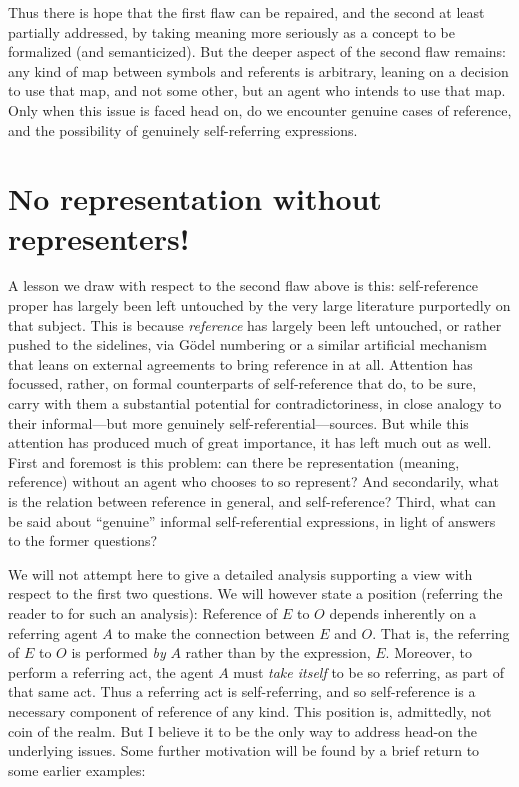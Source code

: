 \documentclass{amsart}
\begin{document}
Thus there is hope that the first flaw can be repaired, and the second
at least partially addressed, by taking meaning more seriously as a
concept to be formalized (and semanticized).  But the deeper aspect of
the second flaw remains: any kind of map between symbols and referents
is arbitrary, leaning on a decision to use that map, and not some
other, but an agent who intends to use that map.  Only when this issue
is faced head on, do we encounter genuine cases of reference, and the
possibility of genuinely self-referring expressions.


\section{No representation without representers!}

A lesson we draw with respect to the second flaw above is this:
self-reference proper has largely been 
left untouched by the very large literature purportedly on that
subject. This is because {\em reference} has largely been left
untouched, or rather pushed to the sidelines, via G\"odel numbering or
a similar artificial mechanism that leans on external agreements to
bring reference in at all. Attention has focussed, rather, on formal
counterparts of self-reference that do, to be sure, carry with them a
substantial potential for contradictoriness, in close analogy to their
informal---but more genuinely self-referential---sources.  But while
this attention has produced much of great importance, it has left much
out as well.  First and foremost is this problem: can there be
representation (meaning, reference) without an agent who chooses to so
represent?  And secondarily, what is the relation between reference in
general, and self-reference?  Third, what can be said about
``genuine'' informal self-referential expressions, in light of answers
to the former questions?

We will not attempt here to give a detailed analysis supporting a view
with respect to the first two questions. We will however state a position
(referring the reader to
\cite{perlis:putting1,perlis:putting2,perlis97:consciousness,perlis00:what}
for such an analysis):
Reference of $E$ to $O$ depends inherently on a referring agent $A$ to make the
connection between $E$ and $O$.  That is, the referring of $E$ to $O$ is
performed {\em by} $A$ rather than by the expression, $E$.  Moreover,
to perform a referring act, the agent $A$ must {\em take itself} to be
so referring, as part of that same act. Thus a referring act is
self-referring, and so self-reference is a necessary component of
reference of any kind.  This position is, admittedly, not coin of the
realm. But I believe it to be the only way to address head-on the
underlying issues. Some further motivation will be found by a brief
return to some earlier examples:
\end{document}
